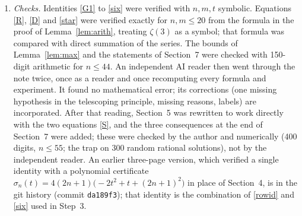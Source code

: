 \documentclass[11pt]{article}
\begin{document}
\begin{enumerate}
$\frac7{24}\zeta(3)$, the decay of the rows. \emph{Sketch:} note~1; the least-energy statement of Section~7. \emph{Heuristic:} the staircase
argument; the remark on the exponent of $t$ for $\zeta(2)$. \emph{Interpretation, not used:} the
resistor network. \emph{Quoted, neither proved nor used in the proof:} $D_n=e^{n+o(n)}$; the
classical recurrence for $\zeta(2)$; the attributions to Ap\'ery.
\item \emph{Checks.} Identities \eqref{G1} to \eqref{six} were verified with $n,m,t$ symbolic.
Equations \eqref{R}, \eqref{D} and \eqref{star} were verified exactly for $n,m\le20$ from the
formula in the proof of Lemma~\ref{lem:arith}, treating $\zeta(3)$ as a symbol; that formula was
compared with direct summation of the series. The bounds of Lemma~\ref{lem:max} and the statements
of Section~7 were checked with 150-digit arithmetic for $n\le44$. An independent AI reader then
went through the note twice, once as a reader and once recomputing every formula and experiment.
It found no mathematical error; its corrections (one missing hypothesis in the telescoping
principle, missing reasons, labels) are incorporated. After that reading, Section~5 was rewritten
to work directly with the two equations \eqref{S}, and the three consequences at the end of
Section~7 were added; these were checked by the author and numerically (400 digits, $n\le55$; the
trap on 300 random rational solutions), not by the independent reader. An earlier three-page version, which
verified a single identity with a polynomial certificate
$\sigma_n(t)=4(2n+1)\bigl(-2t^2+t+(2n+1)^2\bigr)$ in place of Section~4, is in the git history (commit
\texttt{da189f3}); that identity is the combination of \eqref{rowid} and \eqref{six} used in
Step~3.
\end{enumerate}
\end{document}
